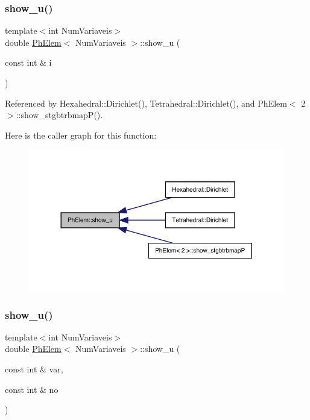 \subsubsection{\texorpdfstring{show\+\_\+u()}{show\_u()}\hspace{0.1cm}{\footnotesize\ttfamily [1/2]}}
{\footnotesize\ttfamily template$<$int Num\+Variaveis$>$ \\
double \hyperlink{classPhElem}{Ph\+Elem}$<$ Num\+Variaveis $>$\+::show\+\_\+u (\begin{DoxyParamCaption}\item[{const int \&}]{i }\end{DoxyParamCaption})}



Referenced by Hexahedral\+::\+Dirichlet(), Tetrahedral\+::\+Dirichlet(), and Ph\+Elem$<$ 2 $>$\+::show\+\_\+stgbtrbmap\+P().

Here is the caller graph for this function\+:
\nopagebreak
\begin{figure}[H]
\begin{center}
\leavevmode
\includegraphics[width=317pt]{classPhElem_a27e7bc9ed0ea64d609d4d0b29baba468_icgraph}
\end{center}
\end{figure}
\mbox{\label{classPhElem_a9d2b7b826289ccd180fdd4b45d0d7333}} 
\subsubsection{\texorpdfstring{show\+\_\+u()}{show\_u()}\hspace{0.1cm}{\footnotesize\ttfamily [2/2]}}
{\footnotesize\ttfamily template$<$int Num\+Variaveis$>$ \\
double \hyperlink{classPhElem}{Ph\+Elem}$<$ Num\+Variaveis $>$\+::show\+\_\+u (\begin{DoxyParamCaption}\item[{const int \&}]{var,  }\item[{const int \&}]{no }\end{DoxyParamCaption})}



